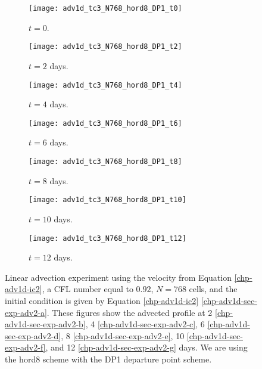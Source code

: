 \begin{figure}[!htb]
	\centering
	\begin{subfigure}{0.3\textwidth}
		\centering
		\texttt{[image: adv1d\_tc3\_N768\_hord8\_DP1\_t0]}
		\caption{$t=0$.\label{chp-adv1d-sec-exp-adv2-a}}
	\end{subfigure}
	\begin{subfigure}{0.3\textwidth}
		\centering
		\texttt{[image: adv1d\_tc3\_N768\_hord8\_DP1\_t2]}
		\caption{$t=2$ days.\label{chp-adv1d-sec-exp-adv2-b}}
	\end{subfigure}
	\begin{subfigure}{0.3\textwidth}
		\centering
		\texttt{[image: adv1d\_tc3\_N768\_hord8\_DP1\_t4]}
		\caption{$t=4$ days.\label{chp-adv1d-sec-exp-adv2-c}}
	\end{subfigure}
	
	\begin{subfigure}{0.3\textwidth}
		\centering
		\texttt{[image: adv1d\_tc3\_N768\_hord8\_DP1\_t6]}
		\caption{$t=6$ days.\label{chp-adv1d-sec-exp-adv2-d}}
	\end{subfigure}
	\begin{subfigure}{0.3\textwidth}
		\centering
		\texttt{[image: adv1d\_tc3\_N768\_hord8\_DP1\_t8]}
		\caption{$t=8$ days.\label{chp-adv1d-sec-exp-adv2-e}}
	\end{subfigure}
	\begin{subfigure}{0.3\textwidth}
		\centering
		\texttt{[image: adv1d\_tc3\_N768\_hord8\_DP1\_t10]}
		\caption{$t=10$ days.\label{chp-adv1d-sec-exp-adv2-f}}
	\end{subfigure}
	\begin{subfigure}{0.3\textwidth}
		\centering
		\texttt{[image: adv1d\_tc3\_N768\_hord8\_DP1\_t12]}
		\caption{$t=12$ days.\label{chp-adv1d-sec-exp-adv2-g}}
	\end{subfigure}
	\caption{Linear advection experiment using the velocity from Equation \eqref{chp-adv1d-ic2},
		a CFL number equal to $0.92$, $N=768$ cells, and the initial condition is given by 
		Equation \eqref{chp-adv1d-ic2} \eqref{chp-adv1d-sec-exp-adv2-a}.
		These figures show the advected profile at
		2 \eqref{chp-adv1d-sec-exp-adv2-b}, 
		4  \eqref{chp-adv1d-sec-exp-adv2-c},
		6  \eqref{chp-adv1d-sec-exp-adv2-d},
		8  \eqref{chp-adv1d-sec-exp-adv2-e},
		10  \eqref{chp-adv1d-sec-exp-adv2-f},
		and 12  \eqref{chp-adv1d-sec-exp-adv2-g} days.
		We are using the hord8 scheme with the DP1 departure point scheme. \label{chp-adv1d-sec-exp-adv2}}
\end{figure}


